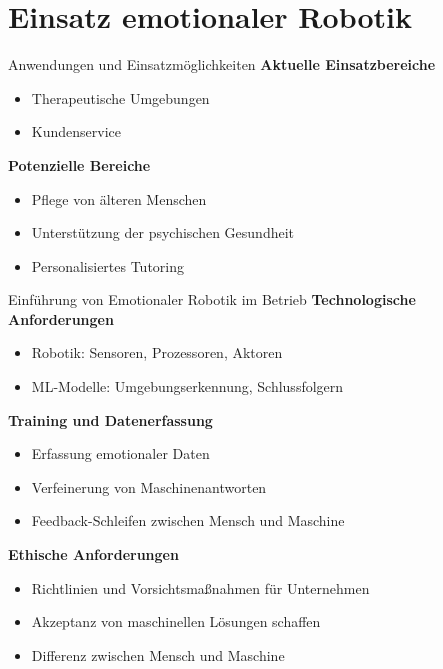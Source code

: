 \documentclass[aspectratio=169]{beamer}
\begin{document}
\section{Einsatz emotionaler Robotik}
\begin{frame}{Anwendungen und Einsatzmöglichkeiten}
  \textbf{Aktuelle Einsatzbereiche}
  \begin{itemize}
    \item Therapeutische Umgebungen
    \item Kundenservice
  \end{itemize}
  \vspace{1cm}

  \textbf{Potenzielle Bereiche}
  \begin{itemize}
    \item Pflege von älteren Menschen
    \item Unterstützung der psychischen Gesundheit
    \item Personalisiertes Tutoring
  \end{itemize}
\end{frame}

\begin{frame}{Einführung von Emotionaler Robotik im Betrieb}
  \textbf{Technologische Anforderungen}
  \begin{itemize}
    \item Robotik: Sensoren, Prozessoren, Aktoren
    \item ML-Modelle: Umgebungserkennung, Schlussfolgern
  \end{itemize}
  \vspace{.5cm}

  \textbf{Training und Datenerfassung}
  \begin{itemize}
    \item Erfassung emotionaler Daten
    \item Verfeinerung von Maschinenantworten
    \item Feedback-Schleifen zwischen Mensch und Maschine
  \end{itemize}
  \vspace{.5cm}

  \textbf{Ethische Anforderungen}
  \begin{itemize}
    \item Richtlinien und Vorsichtsmaßnahmen für Unternehmen
    \item Akzeptanz von maschinellen Lösungen schaffen
    \item Differenz zwischen Mensch und Maschine
  \end{itemize}
\end{frame}
\end{document}
